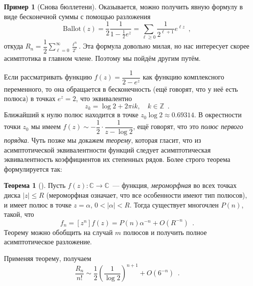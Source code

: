 \documentclass[a5paper]{article}
\def \Z {\mathbb Z}
\def \C {\mathbb C}
\theoremstyle{definition}
\newtheorem{example}{Пример}
\newtheorem*{theorem}{Теорема}
\begin{document}
\begin{example}[Снова бюллетени]
Оказывается, можно получить явную формулу в виде бесконечной суммы с помощью 
разложения
\[
	\mathrm{Ballot}(z) = \dfrac{1}{2} \dfrac{1}{1 - \tfrac12 e^{z}} = 
	\sum_{\ell \geq 0} 
	\dfrac{1}{2^{\ell + 1}} e^{\ell z} \enspace ,
\]
откуда \( R_n = \dfrac{1}{2} \sum_{\ell = 0}^{\infty} \tfrac{\ell^n}{2^\ell} 
\). Эта формула довольно милая, но нас интересует скорее асимптотика в главном 
члене. Поэтому мы пойдём другим путём.

Если рассматривать функцию \( f(z) = \dfrac{1}{2 - e^z} \) как функцию 
комплексного переменного, то она обращается в бесконечность (ещё говорят, что у 
неё есть полюса) в точках \( e^z = 2 \), что эквивалентно
\[
	z_k = \log 2 + 2 \pi i k, \quad k \in \Z \enspace .
\]
Ближайший к нулю полюс находится в точке \( z_0 \log 2 \approx 0.69314 \). В 
окрестности точки \( z_0 \) мы имеем \( f(z) \sim -\dfrac12 \cdot \dfrac{1}{z - 
\log 
2}\), ещё говорят, что это \textit{полюс первого порядка}. Чуть позже мы 
докажем \textit{теорему}, которая гласит, что из асимптотической 
эквивалентности функций следует асимптотическая эквивалентность коэффициентов 
их степенных рядов. Более строго теорема формулируется так:

\begin{theorem}[{\cite[Theorem IV.10, page 258]{ac}}]
	Пусть \( f(z) \colon \C \to \C \)~--- функция, \textit{мероморфная} во всех 
	точках диска \( |z| \leq R \) (мероморфная означает, что все особенности 
	имеют тип полюсов), и имеет полюс в точке \( z = \alpha \), \( 0 < |\alpha| 
	< R 
	\). Тогда существует многочлен \( P(n) \), такой, что
	\[
		f_n = [z^n] f(z) = P(n) \alpha^{-n} + O(R^{-n}) \enspace .
	\]
	Теорему можно обобщить на случай \( m \) полюсов и получить полное 
	асимптотическое разложение.
\end{theorem}
Применяя теорему, получаем
\[
	\dfrac{R_n}{n!} \sim \dfrac12 \left(\dfrac{1}{\log 2}\right)^{n+1} + 
	O(6^{-n}) 
	\enspace .
\]
\end{example}
\end{document}
